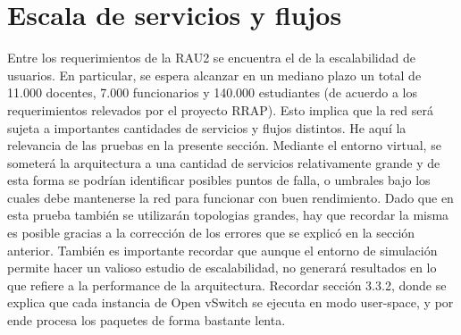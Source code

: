 \section{Escala de servicios y flujos}
Entre los requerimientos de la RAU2 se encuentra el de la escalabilidad de usuarios. En particular, se espera alcanzar en un mediano plazo un total de 11.000 docentes, 7.000 funcionarios y 140.000 estudiantes (de acuerdo a los requerimientos relevados por el proyecto RRAP). Esto implica que la red será sujeta a importantes cantidades de servicios y flujos distintos. He aquí la relevancia de las pruebas en la presente sección. Mediante el entorno virtual, se someterá la arquitectura a una cantidad de servicios relativamente grande y de esta forma se podrían identificar posibles puntos de falla, o umbrales bajo los cuales debe mantenerse la red para funcionar con buen rendimiento. Dado que en esta prueba también se utilizarán topologias grandes, hay que recordar la misma es posible gracias a la corrección de los errores que se explicó en la sección anterior. También es importante recordar que aunque el entorno de simulación permite hacer un valioso estudio de escalabilidad, no generará resultados en lo que refiere a la performance de la arquitectura. Recordar sección 3.3.2, donde se explica que cada instancia de Open vSwitch se ejecuta en modo user-space, y por ende procesa los paquetes de forma bastante lenta.

